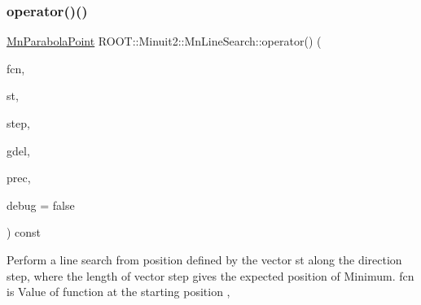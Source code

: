 \subsubsection{\texorpdfstring{operator()()}{operator()()}\hspace{0.1cm}{\footnotesize\ttfamily [1/2]}}
{\footnotesize\ttfamily \mbox{\hyperlink{classROOT_1_1Minuit2_1_1MnParabolaPoint}{Mn\+Parabola\+Point}} R\+O\+O\+T\+::\+Minuit2\+::\+Mn\+Line\+Search\+::operator() (\begin{DoxyParamCaption}\item[{const \mbox{\hyperlink{classROOT_1_1Minuit2_1_1MnFcn}{Mn\+Fcn}} \&}]{fcn,  }\item[{const \mbox{\hyperlink{classROOT_1_1Minuit2_1_1MinimumParameters}{Minimum\+Parameters}} \&}]{st,  }\item[{const \mbox{\hyperlink{namespaceROOT_1_1Minuit2_a62ed97730a1ca8d3fbaec64a19aa11c9}{Mn\+Algebraic\+Vector}} \&}]{step,  }\item[{double}]{gdel,  }\item[{const \mbox{\hyperlink{classROOT_1_1Minuit2_1_1MnMachinePrecision}{Mn\+Machine\+Precision}} \&}]{prec,  }\item[{bool}]{debug = {\ttfamily false} }\end{DoxyParamCaption}) const}

Perform a line search from position defined by the vector st along the direction step, where the length of vector step gives the expected position of Minimum. fcn is Value of function at the starting position ,

